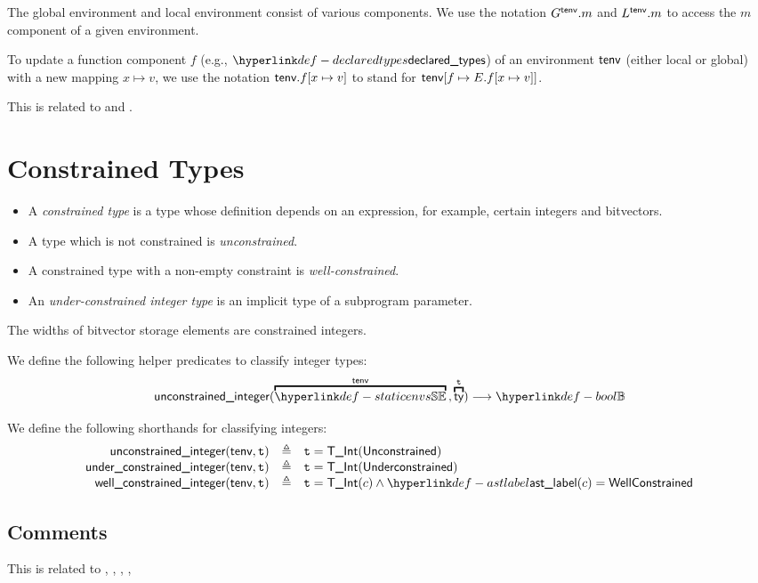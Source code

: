 \documentclass{book}
\newcommand\isunconstrainedinteger[0]{\textsf{unconstrained\_integer}}
\newcommand\isunderconstrainedinteger[0]{\textsf{under\_constrained\_integer}}
\newcommand\iswellconstrainedinteger[0]{\textsf{well\_constrained\_integer}}
\newcommand\vt[0]{\texttt{t}}
\begin{document}
The global environment and local environment consist of various components.
We use the notation $G^{\textsf{tenv}}.m$ and $L^{\textsf{tenv}}.m$ to access the $m$ component of a given environment.

To update a function component $f$ (e.g., $\declaredtypes$) of an environment $\textsf{tenv}$ (either local or global)
with a new mapping $x \mapsto v$, we use the notation $\textsf{tenv}.f[x \mapsto v]$ to stand for $\textsf{tenv}[f \mapsto E.f[x \mapsto v]]$.

This is related to  and .

\section{Constrained Types}
\begin{itemize}
  \item A \emph{constrained type} is a type whose definition depends on an expression, for example, certain integers and bitvectors.
  \item A type which is not constrained is \emph{unconstrained}.
  \item A constrained type with a non-empty constraint is \emph{well-constrained}.
  \item An \emph{under-constrained integer type} is an implicit type of a subprogram parameter.
  \end{itemize}
The widths of bitvector storage elements are constrained integers.

We define the following helper predicates to classify integer types:
\[
  \isunconstrainedinteger(\overname{\staticenvs}{\tenv} \aslsep \overname{\ty}{\vt}) \aslto \Bool
\]

We define the following shorthands for classifying integers:
\[
  \begin{array}{rcl}
  \isunconstrainedinteger(\tenv, \vt) &\triangleq& \vt = \TInt(\unconstrained)\\
  \isunderconstrainedinteger(\tenv, \vt) &\triangleq& \vt = \TInt(\underconstrained)\\
  \iswellconstrainedinteger(\tenv, \vt) &\triangleq& \vt = \TInt(c) \land \astlabel(c)=\wellconstrained\\
\end{array}
\]

\subsection{Comments}
    This is related to , , , , 
\end{document}
